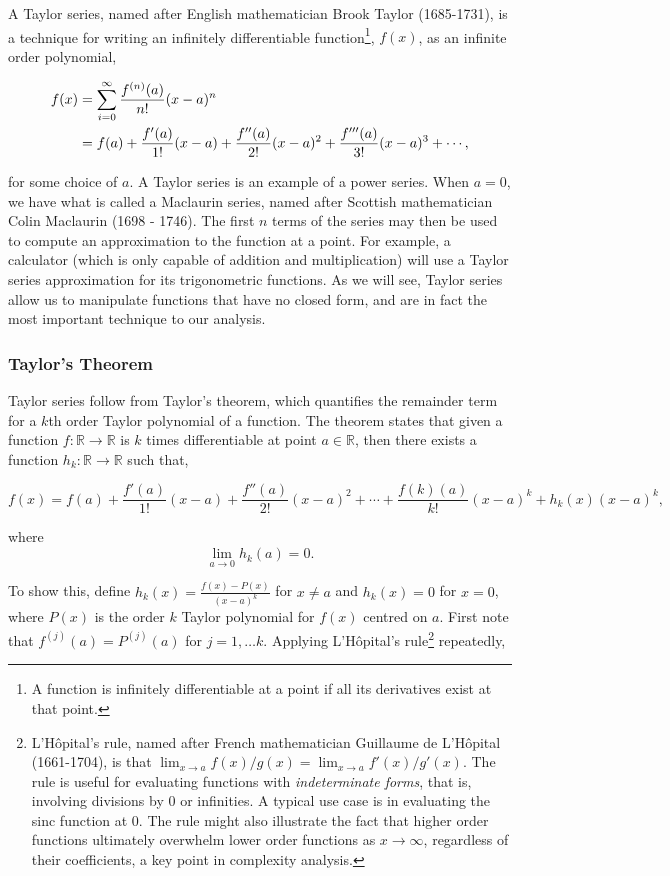 \documentclass[11pt]{amsart}
\begin{document}
A Taylor series, named after English mathematician Brook Taylor (1685-1731), is a technique for writing an infinitely differentiable function\footnote{A function is infinitely differentiable at a point if all its derivatives exist at that point.}, $f(x)$, as an infinite order polynomial,

\begin{align}
f(x) &= \sum_{i = 0}^{\infty} \frac{f^{(n)}(a)}{n!}(x - a)^n \notag \\
&= f(a) + \frac{f'(a)}{1!}(x - a) + \frac{f''(a)}{2!}(x - a)^2 + \frac{f'''(a)}{3!}(x - a)^3 + \cdots \notag,
\end{align}

for some choice of $a$. A Taylor series is an example of a power series. When $a = 0$, we have what is called a Maclaurin series, named after Scottish mathematician Colin Maclaurin (1698 - 1746). The first $n$ terms of the series may then be used to compute an approximation to the function at a point. For example, a calculator (which is only capable of addition and multiplication) will use a Taylor series approximation for its trigonometric functions. As we will see, Taylor series allow us to manipulate functions that have no closed form, and are in fact the most important technique to our analysis.

\subsubsection{Taylor's Theorem}

Taylor series follow from Taylor's theorem, which quantifies the remainder term for a $k$th order Taylor polynomial of a function. The theorem states that given a function $f : \mathbb{R} \to \mathbb{R}$ is $k$ times differentiable at point $a \in \mathbb{R}$, then there exists a function $h_k : \mathbb{R} \to \mathbb{R}$ such that,

$$f(x) = f(a) + \frac{f'(a)}{1!}(x - a) + \frac{f''(a)}{2!}(x - a)^2 + \cdots  + \frac{f(k)(a)}{k!}(x - a)^k + h_k(x)(x - a)^k,$$

where $$\lim_{a \to 0}h_k(a) = 0.$$

To show this, define $h_k(x) = \frac{f(x) - P(x)}{(x - a)^k}$ for $x \neq a$ and $h_k(x) = 0$ for $x = 0$, where $P(x)$ is the order $k$ Taylor polynomial for $f(x)$ centred on $a$. First note that $f^{(j)}(a) = P^{(j)}(a)$ for $j = 1, \dots k$. Applying L'H\^{o}pital's rule\footnote{L'H\^{o}pital's rule, named after French mathematician Guillaume de L'H\^{o}pital (1661-1704), is that $\lim_{x\to a} f(x)/g(x) = \lim_{x\to a} f'(x)/g'(x)$. The rule is useful for evaluating functions with \emph{indeterminate forms}, that is, involving divisions by 0 or infinities. A typical use case is in evaluating the sinc function at 0. The rule might also illustrate the fact that higher order functions ultimately overwhelm lower order functions as $x \to \infty$, regardless of their coefficients, a key point in complexity analysis.} repeatedly,
\end{document}
